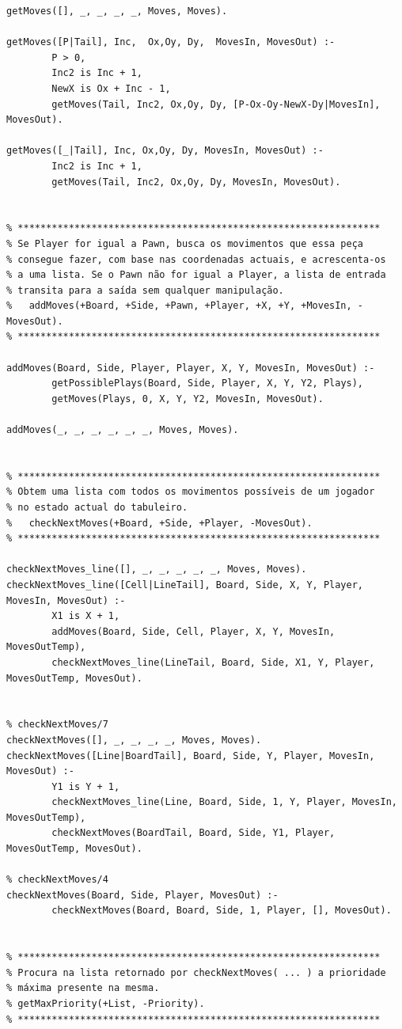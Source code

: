 \documentclass[15pt,a4paper]{article}
\begin{document}
\begin{lstlisting}
getMoves([], _, _, _, _, Moves, Moves).

getMoves([P|Tail], Inc,  Ox,Oy, Dy,  MovesIn, MovesOut) :-
		P > 0,
		Inc2 is Inc + 1,
		NewX is Ox + Inc - 1,
		getMoves(Tail, Inc2, Ox,Oy, Dy, [P-Ox-Oy-NewX-Dy|MovesIn], MovesOut).			

getMoves([_|Tail], Inc, Ox,Oy, Dy, MovesIn, MovesOut) :-
		Inc2 is Inc + 1,
		getMoves(Tail, Inc2, Ox,Oy, Dy, MovesIn, MovesOut).
		
		
% ****************************************************************
% Se Player for igual a Pawn, busca os movimentos que essa peça
% consegue fazer, com base nas coordenadas actuais, e acrescenta-os
% a uma lista. Se o Pawn não for igual a Player, a lista de entrada
% transita para a saída sem qualquer manipulação.
%	addMoves(+Board, +Side, +Pawn, +Player, +X, +Y, +MovesIn, -MovesOut).
% ****************************************************************
	
addMoves(Board, Side, Player, Player, X, Y, MovesIn, MovesOut) :-
		getPossiblePlays(Board, Side, Player, X, Y, Y2, Plays),
		getMoves(Plays, 0, X, Y, Y2, MovesIn, MovesOut).

addMoves(_, _, _, _, _, _, Moves, Moves).		


% ****************************************************************
% Obtem uma lista com todos os movimentos possíveis de um jogador
% no estado actual do tabuleiro.
%	checkNextMoves(+Board, +Side, +Player, -MovesOut).
% ****************************************************************

checkNextMoves_line([], _, _, _, _, _, Moves, Moves).
checkNextMoves_line([Cell|LineTail], Board, Side, X, Y, Player, MovesIn, MovesOut) :-
		X1 is X + 1,
		addMoves(Board, Side, Cell, Player, X, Y, MovesIn, MovesOutTemp),
		checkNextMoves_line(LineTail, Board, Side, X1, Y, Player, MovesOutTemp, MovesOut).
	

% checkNextMoves/7
checkNextMoves([], _, _, _, _, Moves, Moves).
checkNextMoves([Line|BoardTail], Board, Side, Y, Player, MovesIn, MovesOut) :-
		Y1 is Y + 1,
		checkNextMoves_line(Line, Board, Side, 1, Y, Player, MovesIn, MovesOutTemp),
		checkNextMoves(BoardTail, Board, Side, Y1, Player, MovesOutTemp, MovesOut).

% checkNextMoves/4
checkNextMoves(Board, Side, Player, MovesOut) :-
		checkNextMoves(Board, Board, Side, 1, Player, [], MovesOut).


% ****************************************************************
% Procura na lista retornado por checkNextMoves( ... ) a prioridade
% máxima presente na mesma.
% getMaxPriority(+List, -Priority).
% ****************************************************************


\end{lstlisting}
\end{document}
